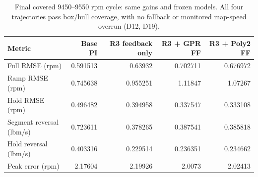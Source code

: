 \begin{table}[htbp]\centering\small\setlength{\tabcolsep}{4pt}\begin{tabular}{@{}lrrrr@{}}\toprule
Metric & Base PI & R3 feedback only & R3 + GPR FF & R3 + Poly2 FF\\\midrule
Full RMSE (rpm) & 0.591513 & 0.63932 & 0.702711 & 0.676972\\
Ramp RMSE (rpm) & 0.745638 & 0.955251 & 1.11847 & 1.07267\\
Hold RMSE (rpm) & 0.496482 & 0.394958 & 0.337547 & 0.333108\\
Segment reversal (lbm/s) & 0.723611 & 0.378265 & 0.387541 & 0.385818\\
Hold reversal (lbm/s) & 0.403316 & 0.229514 & 0.236351 & 0.234662\\
Peak error (rpm) & 2.17604 & 2.19926 & 2.0073 & 2.02413\\
\bottomrule\end{tabular}\caption{Final covered 9450--9550 rpm cycle: same gains and frozen models. All four trajectories pass box/hull coverage, with no fallback or monitored map-speed overrun (D12, D19).}\label{tab:cycle}\end{table}